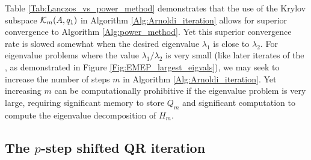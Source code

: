 Table \ref{Tab:Lanczos_vs_power_method} demonstrates that the use of the Krylov subspace ${\mathcal K}_m(A, 	q_1)$ in Algorithm \ref{Alg:Arnoldi_iteration} allows for superior convergence to Algorithm \ref{Alg:power_method}.  Yet this superior convergence rate is slowed somewhat when the desired eigenvalue $\lambda_1$ is close to $\lambda_2$.  For eigenvalue problems where the value $\lambda_1 / \lambda_2$ is very small (like later iterates of the \emep, as demonstrated in Figure \ref{Fig:EMEP_largest_eigvals}), we may seek to increase the number of steps $m$ in Algorithm \ref{Alg:Arnoldi_iteration}.  Yet increasing $m$ can be computationally prohibitive if the eigenvalue problem is very large, requiring significant memory to store $Q_m$ and significant computation to compute the eigenvalue decomposition of $H_m$.






\subsection{The $p$-step shifted QR iteration} 			\label{Subsubsec:evol_mats-QR_iteration}


